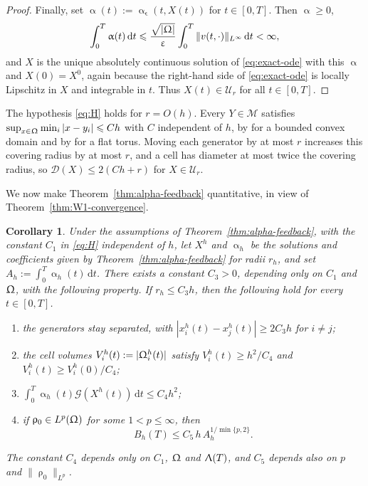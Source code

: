 \documentclass[letterpaper,11pt,twoside]{article}
\numberwithin{figure}{section}
\numberwithin{table}{section}
\theoremstyle{cpamplain}
\newtheorem{corollary}[theorem]{Corollary}
\theoremstyle{cpamdefinition}
\newcommand{\diff}{\mathrm{d}}
\let\alpha\upalpha
\let\varepsilon\upvarepsilon
\let\rho\uprho
\let\Lambda\Uplambda
\let\Omega\Upomega
\renewcommand{\le}{\leqslant}
\renewcommand{\ge}{\geqslant}
\numberwithin{equation}{section}
\begin{document}
\begin{proof}
Finally, set $\alpha(t):=\alpha_\varepsilon(t,X(t))$ for $t\in[0,T]$. Then $\alpha\ge0$,
\[
\int_0^T\alpha(t)\,\diff t
\le\frac{\sqrt{|\Omega|}}{\varepsilon}
\int_0^T\|v(t,\cdot)\|_{L^\infty}\,\diff t<\infty,
\]
and $X$ is the unique absolutely continuous solution of \eqref{eq:exact-ode} with this $\alpha$ and $X(0)=X^0$, again because the right-hand side of \eqref{eq:exact-ode} is locally Lipschitz in $X$ and integrable in $t$.
Thus $X(t)\in\mathcal U_r$ for all $t\in[0,T]$.
\end{proof}

The hypothesis \eqref{eq:H} holds for $r=O(h)$.
Every $Y\in\mathcal M$ satisfies $\sup_{x\in\Omega}\min_i|x-y_i|\le Ch$ with $C$ independent of $h$, by \cite[Proposition~3.1]{GrafLuschgyPages2012} for a bounded convex domain and by \cite[Theorem~1(ii)]{Gruber2004} for a flat torus.
Moving each generator by at most $r$ increases this covering radius by at most $r$, and a cell has diameter at most twice the covering radius, so $\mathscr D(X)\le2(Ch+r)$ for $X\in\mathcal U_r$.

We now make Theorem~\ref{thm:alpha-feedback} quantitative, in view of Theorem~\ref{thm:W1-convergence}.

\begin{corollary}\label{cor:mesh-bounds}
Under the assumptions of Theorem~\ref{thm:alpha-feedback}, with the constant $C_1$ in \eqref{eq:H} independent of $h$, let $X^h$ and $\alpha_h$ be the solutions and coefficients given by Theorem~\ref{thm:alpha-feedback} for radii $r_h$, and set $A_h:=\int_0^T\alpha_h(t)\,\diff t$.
There exists a constant $C_3>0$, depending only on $C_1$ and $\Omega$, with the following property.
If $r_h\le C_3h$, then the following hold for every $t\in[0,T]$.
\begin{enumerate}[label=\textup{(\roman*)}]
\item the generators stay separated, with $|x_i^h(t)-x_j^h(t)|\ge2C_3h$ for $i\ne j$;
\item the cell volumes $V_i^h(t):=|\Omega_i^h(t)|$ satisfy $V_i^h(t)\ge h^2/C_4$ and $V_i^h(t)\ge V_i^h(0)/C_4$;
\item $\int_0^T\alpha_h(t)\mathscr G(X^h(t))\,\diff t\le C_4h^2$;
\item if $\rho_0\in L^p(\Omega)$ for some $1<p\le\infty$, then 
\begin{equation}\label{eq:Bh-Lp}
B_h(T)\le C_5\,h\,A_h^{1/\min\{p,2\}} .
\end{equation}
\end{enumerate}
The constant $C_4$ depends only on $C_1$, $\Omega$ and $\Lambda(T)$, and $C_5$ depends also on $p$ and $\|\rho_0\|_{L^p}$.
\end{corollary}
\end{document}

